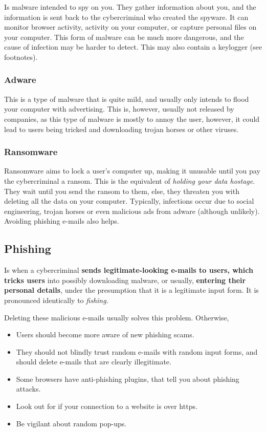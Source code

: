 \documentclass[../main.tex]{subfiles}
\begin{document}
Is malware intended to spy on you. They gather information about you, and the information is sent back to the cybercriminal who created the spyware. It can monitor browser activity, activity on your computer, or capture personal files on your computer. This form of malware can be much more dangerous, and the cause of infection may be harder to detect. This may also contain a keylogger (see footnotes).

\subsubsection{Adware}

This is a type of malware that is quite mild, and usually only intends to flood your computer with advertising. This is, however, usually not released by companies, as this type of malware is mostly to annoy the user, however, it could lead to users being tricked and downloading trojan horses or other viruses.

\subsubsection{Ransomware}

Ransomware aims to lock a user's computer up, making it unusable until you pay the cybercriminal a ransom. This is the equivalent of \emph{holding your data hostage}. They wait until you send the ransom to them, else, they threaten you with deleting all the data on your computer. Typically, infections occur due to social engineering, trojan horses or even malicious ads from adware (although unlikely). Avoiding phishing e-mails also helps.

\subsection{Phishing}

Is when a cybercriminal \textbf{sends legitimate-looking e-mails to users, which tricks users} into possibly downloading malware, or usually, \textbf{entering their personal details}, under the presumption that it is a legitimate input form. It is pronounced identically to \emph{fishing.}

Deleting these malicious e-mails usually solves this problem. Otherwise,

\begin{itemize}
    \item Users should become more aware of new phishing scams.
    \item They should not blindly trust random e-mails with random input forms, and should delete e-mails that are clearly illegitimate.
    \item Some browsers have anti-phishing plugins, that tell you about phishing attacks.
    \item Look out for if your connection to a website is over {\mono https}.
    \item Be vigilant about random pop-ups.
\end{itemize}
\end{document}
